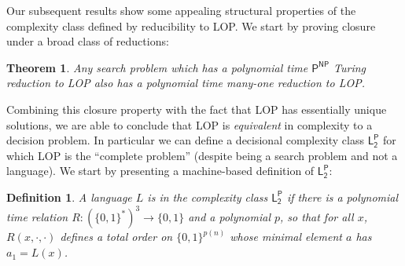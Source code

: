 \documentclass[11pt]{article}
\newtheorem{theorem}{Theorem}
\newtheorem{definition}{Definition}
\newcommand{\B}{\{0,1\}}
\begin{document}
Our subsequent results show some appealing structural properties of the complexity class defined by reducibility to LOP. We start by proving closure under a broad class of reductions:
\begin{theorem}\label{thm:l2p-closure-intro}
Any search problem which has a polynomial time $\mathsf{P^{NP}}$ Turing reduction to LOP also has a polynomial time many-one reduction to LOP.
\end{theorem}
Combining this closure property with the fact that LOP has essentially unique solutions, we are able to conclude that LOP is \emph{equivalent} in complexity to a decision problem. In particular we can define a decisional complexity class $\mathsf{L_2^P}$ for which LOP is the ``complete problem'' (despite being a search problem and not a language). We start by presenting a machine-based definition of $\mathsf{L_2^P}$:
\begin{definition}\label{def:l2p}
A language $L$ is in the complexity class $\mathsf{L_2^P}$ if there is a polynomial time relation $R: (\B^*)^3 \to \B$ and a polynomial $p$, so that for all $x$, $R(x, \cdot, \cdot)$ defines a total order on $\B^{p(n)}$ whose minimal element $a$ has $a_1 = L(x)$. 
\end{definition}
\end{document}
